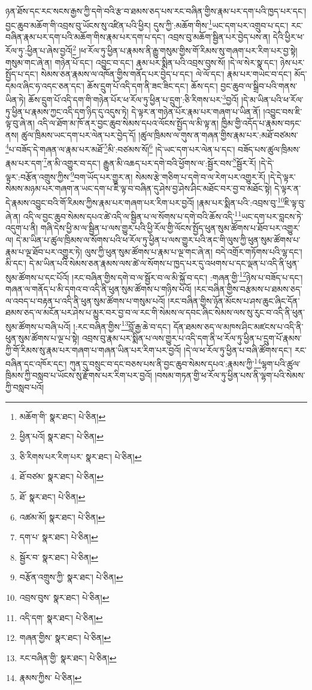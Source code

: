 ཉན་ཐོས་དང་རང་སངས་རྒྱས་ཀྱི་དགེ་བའི་རྩ་བ་ཐམས་ཅད་པས་རང་བཞིན་གྱིས་རྣམ་པར་དག་པའི་ཁྱད་པར་དང་། བྱང་ཆུབ་མཆོག་གི་འབྲས་བུ་ཡོངས་སུ་འཛིན་པའི་ཕྱིར། དུས་ཀྱི་:མཆོག་གིས་\footnote{མཆོག་གི་  སྣར་ཐང་།  པེ་ཅིན། }ཡང་དག་པར་འགྲུབ་པ་དང་། རང་བཞིན་རྣམ་པར་དག་པའི་མཆོག་གིས་རྣམ་པར་དག་པ་དང་། འབྲས་བུ་མཆོག་སྦྱིན་པར་བྱེད་པས་ན། དེའི་ཕྱིར་ཕ་རོལ་ཏུ་:ཕྱིན་པ་ཞེས་བྱའོ།\footnote{ཕྱིན་པའོ།  སྣར་ཐང་།  པེ་ཅིན། } །ཕ་རོལ་ཏུ་ཕྱིན་པ་རྣམས་ནི་རྒྱུ་གསུམ་གྱིས་གོ་རིམས་སུ་གཞག་པར་རིག་པར་བྱ་སྟེ། གསུམ་གང་ཞེ་ན། གཉེན་པོ་དང་། འབྱུང་བ་དང་། རྣམ་པར་སྨིན་པའི་འབྲས་བུས་སོ། །དེ་ལ་སེར་སྣ་དང་། ཉེས་པར་སྤྱོད་པ་དང་། སེམས་ཅན་རྣམས་ལ་འཁོན་གྱིས་གནོད་པར་བྱེད་པ་དང་། ལེ་ལོ་དང་། རྣམ་པར་གཡེང་བ་དང་། མོད་དམའ་ཞིང་ཧ་འདང་ཅན་དང་། ཆོས་དྲུག་པོ་འདི་དག་ནི་ཟང་ཟིང་དང་། ཆོས་དང་། བྱང་ཆུབ་ལ་སྒྲིབ་པའི་གནས་ཡིན་ཏེ། ཆོས་དྲུག་པོ་འདི་དག་གི་གཉེན་པོར་ཕ་རོལ་ཏུ་ཕྱིན་པ་དྲུག་:ཅི་རིགས་པར་\footnote{ཅི་རིགས་པར་རིག་པར་  སྣར་ཐང་།  པེ་ཅིན། }བྱའོ། །དེ་མ་ཡིན་པའི་ཕ་རོལ་ཏུ་ཕྱིན་པ་རྣམས་ཀྱང་འདི་དག་ཉིད་དུ་འདུས་ཏེ། དེ་ལྟར་ན་གཉེན་པོར་རྣམ་པར་གཞག་པ་ཡིན་ནོ། །འབྱུང་བས་ཇི་ལྟ་བུ་ཞེ་ན། འདི་ལ་ཐོག་མ་ཁོ་ནར་བྱང་ཆུབ་སེམས་དཔའ་ལོངས་སྤྱོད་ལ་མི་ལྟ་ན། ཁྱིམ་གྱི་འདོད་པ་རྣམས་བཏང་ནས། ཚུལ་ཁྲིམས་ཡང་དག་པར་ལེན་པར་བྱེད་དོ། །ཚུལ་ཁྲིམས་ལ་གུས་ན་གཞན་གྱིས་རྣམ་པར་:མཐོ་བཙམས་\footnote{ཐོ་བཙམ་  སྣར་ཐང་།  པེ་ཅིན། }པ་བཟོད་དེ་གཞན་ལ་རྣམ་པར་མཐོ་\footnote{ཐོ་  སྣར་ཐང་།  པེ་ཅིན། }མི་:བཙམས་སོ།\footnote{འཚམ་མོ།  སྣར་ཐང་།  པེ་ཅིན། } །དེ་ཡང་དག་པར་ལེན་པ་དང་། བཟོད་པས་ཚུལ་ཁྲིམས་རྣམ་པར་དག་\footnote{དག་པ་  སྣར་ཐང་།  པེ་ཅིན། }ན་མི་འགྱུར་བ་དང་། རྒྱུན་མི་འཆད་པར་དགེ་བའི་ཕྱོགས་ལ་:སྦྱོར་བས་\footnote{སྦྱོར་བ་  སྣར་ཐང་།  པེ་ཅིན། }སྦྱོར་རོ། །དེ་དེ་ལྟར་:བརྩོན་འགྲུས་ཀྱིས་\footnote{བརྩོན་འགྲུས་ཀྱི་  སྣར་ཐང་།  པེ་ཅིན། }བག་ཡོད་པར་གྱུར་ན། སེམས་རྩེ་གཅིག་པ་དགེ་བ་ལ་རེག་པར་འགྱུར་རོ། །དེ་དེ་ལྟར་སེམས་མཉམ་པར་གཞག་ན་ཡང་དག་པ་ཇི་ལྟ་བ་བཞིན་དུ་ཤེས་བྱ་ཤེས་ཤིང་མཐོང་བར་བྱ་བ་མཐོང་སྟེ། དེ་ལྟར་ན་དེ་རྣམས་འབྱུང་བའི་གོ་རིམས་ཀྱིས་རྣམ་པར་གཞག་པར་རིག་པར་བྱའོ། །རྣམ་པར་སྨིན་པའི་:འབྲས་བུ་\footnote{འབྲས་བུས་  སྣར་ཐང་།  པེ་ཅིན། }ཇི་ལྟ་བུ་ཞེ་ན། འདི་ལ་བྱང་ཆུབ་སེམས་དཔའ་ཚེ་འདི་ལ་སྦྱིན་པ་ལ་སོགས་པ་དགེ་བའི་ཆོས་འདི་\footnote{འདི་དག་  སྣར་ཐང་།  པེ་ཅིན། }ཡང་དག་པར་བླངས་ཏེ་འདུག་པ་ནི། གཞི་དེས་ཕྱི་མ་ལ་སྦྱིན་པ་ལས་གྱུར་པའི་ཕྱི་རོལ་གྱི་ལོངས་སྤྱོད་ཕུན་སུམ་ཚོགས་པ་ཐོབ་པར་འགྱུར་ལ། དེ་མ་ཡིན་པ་ཚུལ་ཁྲིམས་ལ་སོགས་པའི་ཕ་རོལ་ཏུ་ཕྱིན་པ་ལས་གྱུར་པའི་ནང་གི་ལུས་ཀྱི་ཕུན་སུམ་ཚོགས་པ་རྣམ་པ་ལྔ་ཐོབ་པར་འགྱུར་ཏེ། ལུས་ཀྱི་ཕུན་སུམ་ཚོགས་པ་རྣམ་པ་ལྔ་གང་ཞེ་ན། བདེ་འགྲོར་གཏོགས་པའི་ལྷ་དང་། མི་དང་། དེ་མ་ཡིན་པའི་སེམས་ཅན་རྣམས་ལས་ཚེ་ལ་སོགས་པ་ཁྱད་པར་དུ་འཕགས་པ་དང་ལྡན་པ་འདི་ནི་ཕུན་སུམ་ཚོགས་པ་དང་པོའོ། །རང་བཞིན་གྱིས་དགེ་བ་ལ་སྦྱོར་བ་ལ་མི་སྐྱོ་བ་དང་། :གཞན་གྱི་\footnote{གཞན་གྱིས་  སྣར་ཐང་།  པེ་ཅིན། }ཉེས་པ་བཟོད་པ་དང་། གཞན་ལ་གནོད་པ་མི་དགའ་བ་འདི་ནི་ཕུན་སུམ་ཚོགས་པ་གཉིས་པའོ། །རང་བཞིན་གྱིས་བརྩམས་པ་ཐམས་ཅད་ལ་འབད་པ་བརྟན་པ་འདི་ནི་ཕུན་སུམ་ཚོགས་པ་གསུམ་པའོ། །རང་བཞིན་གྱིས་ཉོན་མོངས་པ་ཤས་ཆུང་ཞིང་དོན་ཐམས་ཅད་ལ་མངོན་པར་ཤེས་པ་མྱུར་བར་བྱ་བ་ལ་རང་གི་སེམས་ལ་དབང་ཞིང་སེམས་ལས་སུ་རུང་བ་འདི་ནི་ཕུན་སུམ་ཚོགས་པ་བཞི་པའོ། །:རང་བཞིན་གྱིས་\footnote{རང་བཞིན་གྱི་  སྣར་ཐང་།  པེ་ཅིན། }བློ་རྒྱ་ཆེ་བ་དང་། དོན་ཐམས་ཅད་ལ་མཁས་ཤིང་མཛངས་པ་འདི་ནི་ཕུན་སུམ་ཚོགས་པ་ལྔ་པ་སྟེ། འབྲས་བུ་རྣམ་པར་སྨིན་པ་ལས་གྱུར་པ་འདི་དག་ནི་ཕ་རོལ་ཏུ་ཕྱིན་པ་དྲུག་པོ་རྣམས་ཀྱི་གོ་རིམས་སུ་རྣམ་པར་གཞག་པ་གཞན་ཡིན་པར་རིག་པར་བྱའོ། །དེ་ལ་ཕ་རོལ་ཏུ་ཕྱིན་པ་བཞི་ཚོགས་དང་། རང་བཞིན་དང་འཁོར་དང་། ཀུན་དུ་བསྲུང་བ་དང་བཅས་པས་ནི་བྱང་ཆུབ་སེམས་དཔའ་:རྣམས་ཀྱི་\footnote{རྣམས་ཀྱིས་  པེ་ཅིན། }ལྷག་པའི་ཚུལ་ཁྲིམས་ཀྱི་བསླབ་པ་ཡོངས་སུ་རྫོགས་པར་རིག་པར་བྱའོ། །བསམ་གཏན་གྱི་ཕ་རོལ་ཏུ་ཕྱིན་པས་ནི་ལྷག་པའི་སེམས་ཀྱི་བསླབ་པའོ། 